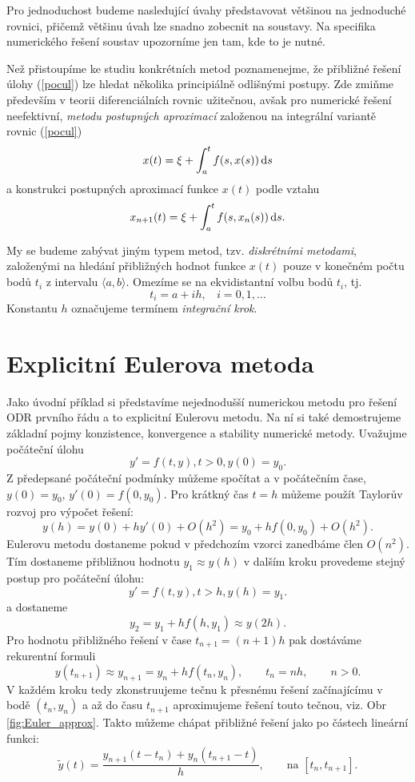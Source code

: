 \documentclass[a4paper, 12pt]{book}
\theoremstyle{definition}
\def\d{\,{\rm d}}               %
\begin{document}
Pro jednoduchost budeme nasledující úvahy představovat většinou na jednoduché rovnici, 
přičemž většinu úvah lze snadno zobecnit na soustavy. Na specifika numerického řešení soustav upozorníme
jen tam, kde to je nutné.

Než přistoupíme ke studiu konkrétních metod poznamenejme, 
že přibližné řešení úlohy (\ref{pocul}) lze hledat několika principiálně
odlišnými postupy. Zde zmiňme především v teorii diferenciálních rovnic 
užitečnou, avšak pro numerické řešení neefektivní, {\em metodu postupných
aproximací} založenou na integrální variantě rovnic (\ref{pocul})
\begin{displaymath}
x(t)=\xi + \int_a^t f(s,x(s))\d s
\end{displaymath}
a konstrukci postupných aproximací funkce $x(t)$ podle vztahu
\begin{displaymath}
x_{n+1}(t)=\xi + \int_a^t f(s,x_n(s))\d s.
\end{displaymath}

My se budeme zabývat jiným typem metod, tzv. {\em diskrétními 
metodami}, založenými na hledání přibližných hodnot funkce $x(t)$ pouze
v konečném počtu bodů $t_i$ z intervalu $\langle a,b\rangle$. Omezíme 
se na ekvidistantní volbu bodů $t_i$, tj.
\begin{displaymath}
t_i=a+ih,~~~~ i=0,1,\dots
\end{displaymath}
Konstantu $h$ označujeme termínem {\em integrační krok}.


\section{Explicitní Eulerova metoda}
Jako úvodní příklad si představíme nejednodušší numerickou metodu pro řešení ODR prvního řádu a
to explicitní Eulerovu metodu. Na ní si také demostrujeme základní pojmy konzistence, konvergence a stability numerické metody.
Uvažujme počáteční úlohu
\[
   y' = f(t,y), t>0, y(0)=y_0.
\]
Z předepsané počáteční podmínky můžeme spočítat  a  v počátečním čase, $y(0) = y_0$, $y'(0) = f(0, y_0)$. 
Pro krátkný čas $t=h$ můžeme použít Taylorův rozvoj pro výpočet řešení:
\[
  y(h) = y(0) + h y'(0) + O(h^2) = y_0 + h f(0, y_0) + O(h^2).
\]
Eulerovu metodu dostaneme pokud v předchozím vzorci zanedbáme člen $O(n^2)$. Tím dostaneme přibližnou hodnotu $y_1 \approx y(h)$
v dalším kroku provedeme stejný postup pro počáteční úlohu:
\[ 
     y' = f(t,y), t>h, y(h)=y_1.
\]
a dostaneme
\[
   y_2 = y_1 + h f(h, y_1) \approx y(2h).
\]
Pro hodnotu přibližného řešení v čase $t_{n+1}=(n+1)h$ pak dostáváme rekurentní formuli
\begin{equation}
   \label{eq:Euler_method}
   y(t_{n+1}) \approx y_{n+1} = y_n + h f(t_n, y_n),\qquad t_n=nh,\qquad n>0.
\end{equation}
V každém kroku tedy zkonstruujeme tečnu k přesnému řešení začínajícímu v bodě $(t_n, y_n)$
a až do času $t_{n+1}$ aproximujeme řešení touto tečnou, viz. Obr \ref{fig:Euler_approx}.
Takto můžeme chápat přibližné řešení jako po částech lineární funkci:
\[
   \tilde y(t) = \frac{y_{n+1}(t - t_n) + y_n(t_{n+1}-t)}{h},\qquad \text{na } [t_n, t_{n+1}].
\]
\end{document}
